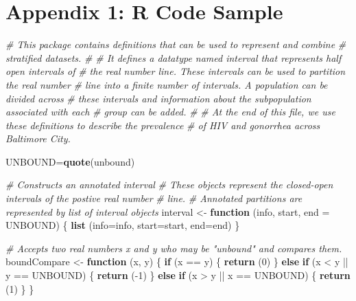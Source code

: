 \documentclass[]{article}
\newenvironment{Shaded}{}{}
\newcommand{\CommentTok}[1]{\textcolor[rgb]{0.38,0.63,0.69}{\textit{#1}}}
\newcommand{\ControlFlowTok}[1]{\textcolor[rgb]{0.00,0.44,0.13}{\textbf{#1}}}
\newcommand{\DataTypeTok}[1]{\textcolor[rgb]{0.56,0.13,0.00}{#1}}
\newcommand{\DecValTok}[1]{\textcolor[rgb]{0.25,0.63,0.44}{#1}}
\newcommand{\KeywordTok}[1]{\textcolor[rgb]{0.00,0.44,0.13}{\textbf{#1}}}
\newcommand{\NormalTok}[1]{#1}
\newcommand{\OperatorTok}[1]{\textcolor[rgb]{0.40,0.40,0.40}{#1}}
\newcommand{\StringTok}[1]{\textcolor[rgb]{0.25,0.44,0.63}{#1}}
\begin{document}
\hypertarget{appendix-1-r-code-sample}{%
\section{Appendix 1: R Code Sample}\label{appendix-1-r-code-sample}}

\begin{Shaded}
\begin{Highlighting}[]
\CommentTok{# This package contains definitions that can be used to represent and combine}
\CommentTok{# stratified datasets.}
\CommentTok{#}
\CommentTok{# It defines a datatype named interval that represents half open intervals of}
\CommentTok{# the real number line. These intervals can be used to partition the real number}
\CommentTok{# line into a finite number of intervals. A population can be divided across}
\CommentTok{# these intervals and information about the subpopulation associated with each}
\CommentTok{# group can be added.}
\CommentTok{#}
\CommentTok{# At the end of this file, we use these definitions to describe the prevalence}
\CommentTok{# of HIV and gonorrhea across Baltimore City.}

\NormalTok{UNBOUND=}\KeywordTok{quote}\NormalTok{(unbound)}

\CommentTok{# Constructs an annotated interval}
\CommentTok{# These objects represent the closed-open intervals of the postive real number}
\CommentTok{# line.}
\CommentTok{# Annotated partitions are represented by list of interval objects}
\NormalTok{interval <-}\StringTok{ }\ControlFlowTok{function}\NormalTok{ (info, start, }\DataTypeTok{end =}\NormalTok{ UNBOUND) \{}
  \KeywordTok{list}\NormalTok{ (}\DataTypeTok{info=}\NormalTok{info, }\DataTypeTok{start=}\NormalTok{start, }\DataTypeTok{end=}\NormalTok{end)}
\NormalTok{\}}

\CommentTok{# Accepts two real numbers x and y who may be "unbound" and compares them.}
\NormalTok{boundCompare <-}\StringTok{ }\ControlFlowTok{function}\NormalTok{ (x, y) \{}
  \ControlFlowTok{if}\NormalTok{ (x }\OperatorTok{==}\StringTok{ }\NormalTok{y) \{ }
    \KeywordTok{return}\NormalTok{ (}\DecValTok{0}\NormalTok{)}
\NormalTok{  \} }\ControlFlowTok{else} \ControlFlowTok{if}\NormalTok{ (x }\OperatorTok{<}\StringTok{ }\NormalTok{y }\OperatorTok{||}\StringTok{ }\NormalTok{y }\OperatorTok{==}\StringTok{ }\NormalTok{UNBOUND) \{}
    \KeywordTok{return}\NormalTok{ (}\OperatorTok{-}\DecValTok{1}\NormalTok{)}
\NormalTok{  \} }\ControlFlowTok{else} \ControlFlowTok{if}\NormalTok{ (x }\OperatorTok{>}\StringTok{ }\NormalTok{y }\OperatorTok{||}\StringTok{ }\NormalTok{x }\OperatorTok{==}\StringTok{ }\NormalTok{UNBOUND) \{}
    \KeywordTok{return}\NormalTok{ (}\DecValTok{1}\NormalTok{)}
\NormalTok{  \}}
\NormalTok{\}}


\end{Highlighting}
\end{Shaded}
\end{document}
